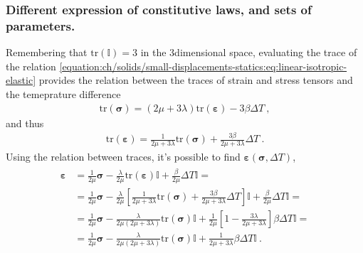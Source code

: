\documentclass[letterpaper,10pt,english]{jupyterBook}
\begin{document}
\subsubsection*{Different expression of constitutive laws, and sets of parameters.}

\sphinxAtStartPar
Remembering that \(\text{tr}(\mathbb{I}) = 3\) in the 3\sphinxhyphen{}dimensional space, evaluating the trace of the relation \eqref{equation:ch/solids/small-displacements-statics:eq:linear-isotropic-elastic} provides the relation between the traces of strain and stress tensors and the temeprature difference
\begin{equation*}
\begin{split}\text{tr} (\symbf{\sigma}) = \left( 2 \mu + 3 \lambda \right) \text{tr} (\symbf{\varepsilon}) - 3 \beta \Delta T \ , \end{split}
\end{equation*}
\sphinxAtStartPar
and thus
\begin{equation*}
\begin{split}\text{tr} (\symbf{\varepsilon}) = \frac{1}{ 2 \mu + 3 \lambda} \text{tr} (\symbf{\sigma}) + \frac{3 \beta}{ 2 \mu + 3 \lambda} \Delta T \ . \end{split}
\end{equation*}
\sphinxAtStartPar
Using the relation between traces, it’s possible to find \(\symbf{\varepsilon}\left(\symbf{\sigma}, \Delta T \right)\),
\begin{equation*}
\begin{split}\begin{aligned}
  \symbf{\varepsilon}
  & = \frac{1}{2 \mu} \symbf{\sigma} - \frac{\lambda}{2\mu} \text{tr}(\symbf{\varepsilon}) \mathbb{I} + \frac{\beta}{2 \mu} \Delta T \mathbb{I} = \\
  & = \frac{1}{2 \mu} \symbf{\sigma} - \frac{\lambda}{2\mu} \left[ \frac{1}{2 \mu + 3 \lambda} \text{tr}(\symbf{\sigma}) + \frac{3 \beta}{2 \mu + 3 \lambda} \Delta T \right] \mathbb{I} + \frac{\beta}{2 \mu} \Delta T \mathbb{I} = \\
  & = \frac{1}{2 \mu} \symbf{\sigma} - \frac{\lambda}{2\mu ( 2 \mu + 3 \lambda)} \text{tr}(\symbf{\sigma}) \mathbb{I} + \frac{1}{2 \mu}\left[ 1 - \frac{3 \lambda}{2 \mu + 3 \lambda} \right] \beta \Delta T \mathbb{I} = \\
  & = \frac{1}{2 \mu} \symbf{\sigma} - \frac{\lambda}{2\mu ( 2 \mu + 3 \lambda)} \text{tr}(\symbf{\sigma}) \mathbb{I} + \frac{1}{2 \mu + 3 \lambda}  \beta \Delta T \mathbb{I} \ .
\end{aligned}\end{split}
\end{equation*}
\end{document}
